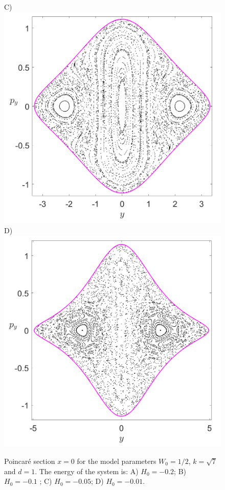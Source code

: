 \documentclass[10pt,aps,onecolumn,superscriptaddress]{revtex4-2}
\begin{document}
\begin{figure}[htbp]
	C)\includegraphics[scale=0.3]{PS_cirque_H_-0_05_x_0_w0_1div2_d_1_k_sqrt7.png}
	D)\includegraphics[scale=0.3]{PS_cirque_H_-0_01_x_0_w0_1div2_d_1_k_sqrt7.png}
	\caption{Poincar\'e section $x = 0$ for the model parameters $W_0 = 1/2$, $k = \sqrt{7}$ and $d = 1$. The energy of the system is: A) $H_0 = -0.2$; B) $H_0 = -0.1$ ; C) $H_0 = -0.05$; D) $H_0 = -0.01$.}
	\label{fig:psec_x_0_bif}
\end{figure}
\end{document}

